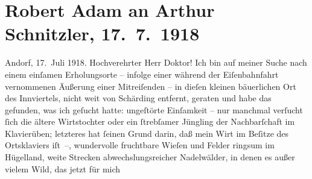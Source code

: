 

         
         \renewcommand{\erwaehntePersonen}{Personen:  Charles I von England,  Hintermayer,  Hintermayer}
         \renewcommand{\erwaehnteOrte}{Orte: Andorf, Bayern, Innviertel, Schärding, Wien}
         \renewcommand{\erwaehnteWerke}{Werke: David Copperfield, Robert, Siebenkäs}
               \section[Robert Adam an Arthur Schnitzler, 17. 7. 1918]{ Robert Adam an Arthur Schnitzler, 17. 7. 1918}\nopagebreak{}\rehead{ }\begin{ledgroupsized}[t]{13cm}\normalsize\beginnumbering \toendnotes[C]{\smallbreak\pagebreak[2]} 
\toendnotes[C]{\smallbreak}\pstart
           \raggedleft{}{\pb}Andorf, 17. Juli 1918.\pend
           \pstart{}Hochverehrter Herr Doktor!\pend\pstart
           Ich bin auf meiner Suche nach einem einſamen Erholungsorte – infolge einer während
               der Eiſenbahnfahrt vernommenen Äußerung einer Mitreiſenden – in dieſen kleinen
               bäuerlichen Ort des Innviertels, nicht weit von Schärding entfernt, geraten und habe das gefunden,
               was ich geſucht hatte: ungeſtörte Einſamkeit – nur manchmal verſucht ſich die ältere
                  Wirtstochter oder ein
               ſtrebſamer Jüngling der Nachbarſchaft im Klavierüben; letzteres hat ſeinen Grund
               darin, daß mein Wirt im Beſitze
               des Ortsklaviers iſt –, wundervolle fruchtbare Wieſen und Felder ringsum im
               Hügelland, weite Strec{\pb}ken
               abwechslungsreicher Nadelwälder, in denen es außer vielem Wild, das jetzt für mich

\end{ledgroupsized}
